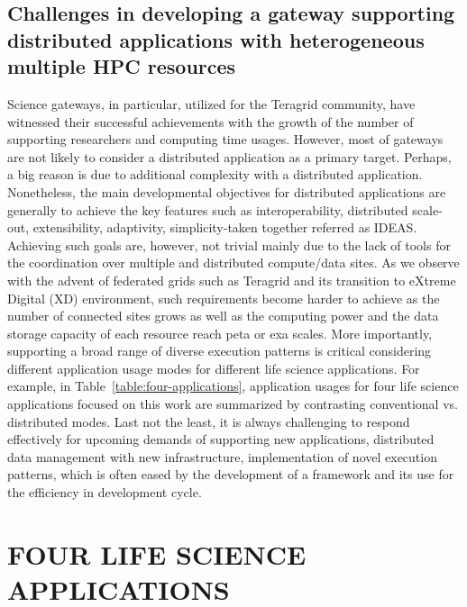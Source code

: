 \documentclass{sig-alternate}
\begin{document}
\subsection{Challenges in developing a gateway supporting distributed applications with heterogeneous multiple HPC resources}

Science gateways, in particular, utilized for the Teragrid community, have witnessed their successful achievements with the growth of the number of supporting researchers and computing time usages.  However, most of gateways are not likely to consider a distributed application as a primary target.  Perhaps, a big reason is due to additional complexity with a distributed application.  Nonetheless, the main developmental objectives for distributed applications are generally to achieve the key features such as interoperability, distributed scale-out, extensibility, adaptivity, simplicity-taken together referred as IDEAS.  Achieving such goals are, however, not trivial mainly due to the lack of tools for the coordination over multiple and distributed compute/data sites.  As we observe with the advent of federated grids such as Teragrid and its transition to eXtreme Digital (XD) environment, such requirements become harder to achieve as the number of connected sites grows as well as the computing power and the data storage capacity of each resource reach peta or exa scales.   More importantly, supporting a broad range of diverse execution patterns is critical considering different application usage modes for different life science applications.  For example, in Table~\ref{table:four-applications}, application usages for four life science applications focused on this work are summarized by contrasting conventional vs. distributed modes.  Last not the least, it is always challenging to respond effectively for upcoming demands of supporting new applications, distributed data management with new infrastructure, implementation of novel execution patterns, which is often eased by the development of a framework and its use for the efficiency in development cycle.   



\section{FOUR LIFE SCIENCE APPLICATIONS}
\end{document}
